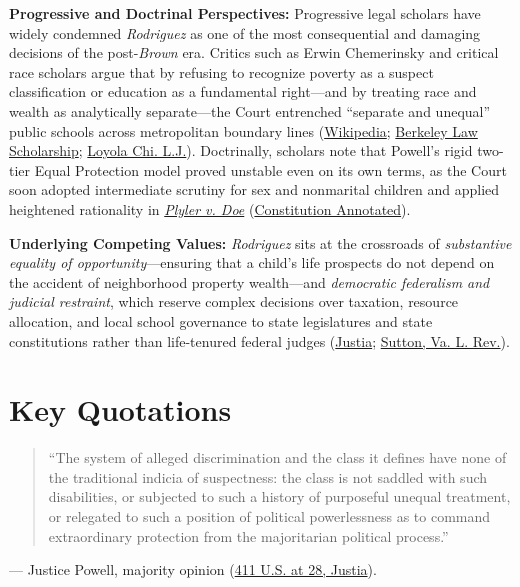 \documentclass[12pt]{article}
\begin{document}
\textbf{Progressive and Doctrinal Perspectives:} Progressive legal scholars have widely condemned \textit{Rodriguez} as one of the most consequential and damaging decisions of the post-\textit{Brown} era. Critics such as Erwin Chemerinsky and critical race scholars argue that by refusing to recognize poverty as a suspect classification or education as a fundamental right---and by treating race and wealth as analytically separate---the Court entrenched ``separate and unequal'' public schools across metropolitan boundary lines (\href{https://en.wikipedia.org/wiki/San_Antonio_Independent_School_District_v._Rodriguez}{Wikipedia}; \href{https://lawcat.berkeley.edu/record/1124439/files/fulltext.pdf}{Berkeley Law Scholarship}; \href{https://loyola-chicago-law-journal.scholasticahq.com/article/92496-_san-antonio-independent-school-district-v-rodriguez_-at-fifty-contingencies-consequences-and-calls-to-action/attachment/193053.pdf}{Loyola Chi. L.J.}). Doctrinally, scholars note that Powell's rigid two-tier Equal Protection model proved unstable even on its own terms, as the Court soon adopted intermediate scrutiny for sex and nonmarital children and applied heightened rationality in \href{https://www.law.cornell.edu/supremecourt/text/457/202}{\textit{Plyler v. Doe}} (\href{https://www.law.cornell.edu/constitution-conan/amendment-14/section-1/educational-opportunity}{Constitution Annotated}).

\textbf{Underlying Competing Values:} \textit{Rodriguez} sits at the crossroads of \emph{substantive equality of opportunity}---ensuring that a child's life prospects do not depend on the accident of neighborhood property wealth---and \emph{democratic federalism and judicial restraint}, which reserve complex decisions over taxation, resource allocation, and local school governance to state legislatures and state constitutions rather than life-tenured federal judges (\href{https://supreme.justia.com/cases/federal/us/411/1/}{Justia}; \href{https://www.virginialawreview.org/wp-content/uploads/2020/12/1963-1.pdf}{Sutton, Va. L. Rev.}).

\section{Key Quotations}

\begin{quote}
``The system of alleged discrimination and the class it defines have none of the traditional indicia of suspectness: the class is not saddled with such disabilities, or subjected to such a history of purposeful unequal treatment, or relegated to such a position of political powerlessness as to command extraordinary protection from the majoritarian political process.''
\end{quote}
\noindent --- Justice Powell, majority opinion (\href{https://supreme.justia.com/cases/federal/us/411/1/}{411 U.S. at 28, Justia}).
\end{document}
